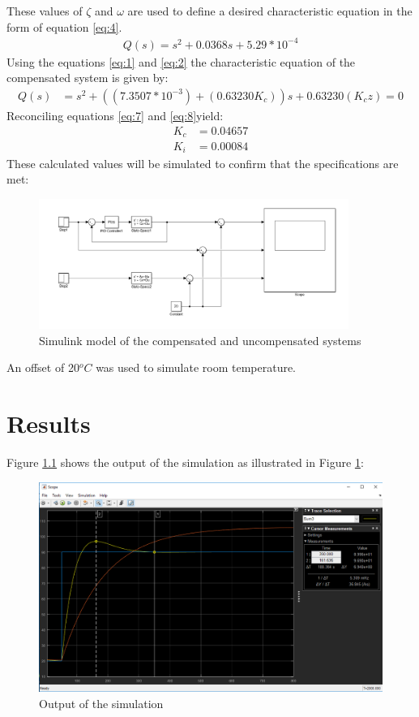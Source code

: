 These values of $\zeta$ and $\omega$ are used to define a desired characteristic equation in the form of equation \ref{eq:4}.
\begin{align}\label{eq:7}
Q(s) = s^2 + 0.0368s + 5.29*10^{-4}
\end{align}
Using the equations \ref{eq:1} and \ref{eq:2} the characteristic equation of the compensated system is given by:
\begin{align}\label{eq:8}
Q(s) &= s^2 +((7.3507*10^{-3})+(0.63230K_c))s + 0.63230( K_cz) = 0
\end{align}
Reconciling equations \ref{eq:7} and \ref{eq:8}yield:
\begin{align}
K_c &= 0.04657\\
K_i &= 0.00084 
\end{align}
These calculated values will be simulated to confirm that the specifications are met:
\begin{figure}[h]
\centering
\includegraphics[width = 0.9\textwidth]{images/simulink_model}
\caption{Simulink model of the compensated and uncompensated systems}
\label{fig:1}
\end{figure}
An offset of 20$^oC$ was used to simulate room temperature.










\chapter{Results}
Figure \ref{fig:2} shows the output of the simulation as illustrated in Figure \ref{fig:1}:
\begin{figure}[h]
\centering
\includegraphics[width = 1\textwidth]{images/simulink_output}
\caption{Output of the simulation}
\label{fig:2}
\end{figure}

